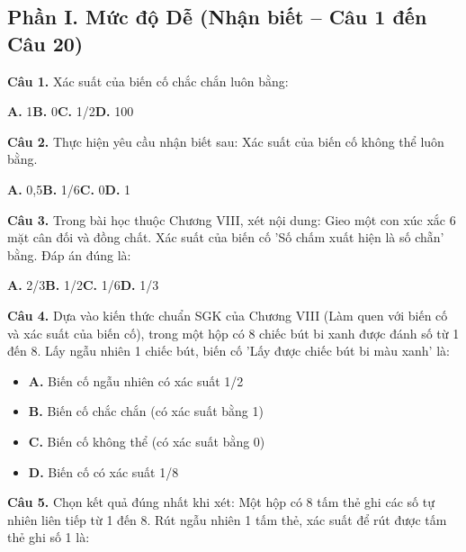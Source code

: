 \documentclass[11pt,a4paper]{article}
\begin{document}
\subsection*{\color{accent} Phần I. Mức độ Dễ (Nhận biết -- Câu 1 đến Câu 20)}
\textbf{\color{primary} Câu 1.} Xác suất của biến cố chắc chắn luôn bằng:\par
\hspace*{1.5em}\textbf{A.} 1\quad\quad \textbf{B.} 0\quad\quad \textbf{C.} 1/2\quad\quad \textbf{D.} 100\par\vspace{2pt}
\textbf{\color{primary} Câu 2.} Thực hiện yêu cầu nhận biết sau: Xác suất của biến cố không thể luôn bằng.\par
\hspace*{1.5em}\textbf{A.} 0,5\quad\quad \textbf{B.} 1/6\quad\quad \textbf{C.} 0\quad\quad \textbf{D.} 1\par\vspace{2pt}
\textbf{\color{primary} Câu 3.} Trong bài học thuộc Chương VIII, xét nội dung: Gieo một con xúc xắc 6 mặt cân đối và đồng chất. Xác suất của biến cố 'Số chấm xuất hiện là số chẵn' bằng. Đáp án đúng là:\par
\hspace*{1.5em}\textbf{A.} 2/3\quad\quad \textbf{B.} 1/2\quad\quad \textbf{C.} 1/6\quad\quad \textbf{D.} 1/3\par\vspace{2pt}
\textbf{\color{primary} Câu 4.} Dựa vào kiến thức chuẩn SGK của Chương VIII (Làm quen với biến cố và xác suất của biến cố), trong một hộp có 8 chiếc bút bi xanh được đánh số từ 1 đến 8. Lấy ngẫu nhiên 1 chiếc bút, biến cố 'Lấy được chiếc bút bi màu xanh' là:\par
\begin{itemize}\setlength{\itemsep}{1pt}\setlength{\parskip}{0pt}
  \item[] \textbf{A.} Biến cố ngẫu nhiên có xác suất 1/2
  \item[] \textbf{B.} Biến cố chắc chắn (có xác suất bằng 1)
  \item[] \textbf{C.} Biến cố không thể (có xác suất bằng 0)
  \item[] \textbf{D.} Biến cố có xác suất 1/8
\end{itemize}\vspace{2pt}
\textbf{\color{primary} Câu 5.} Chọn kết quả đúng nhất khi xét: Một hộp có 8 tấm thẻ ghi các số tự nhiên liên tiếp từ 1 đến 8. Rút ngẫu nhiên 1 tấm thẻ, xác suất để rút được tấm thẻ ghi số 1 là:\par
\end{document}
